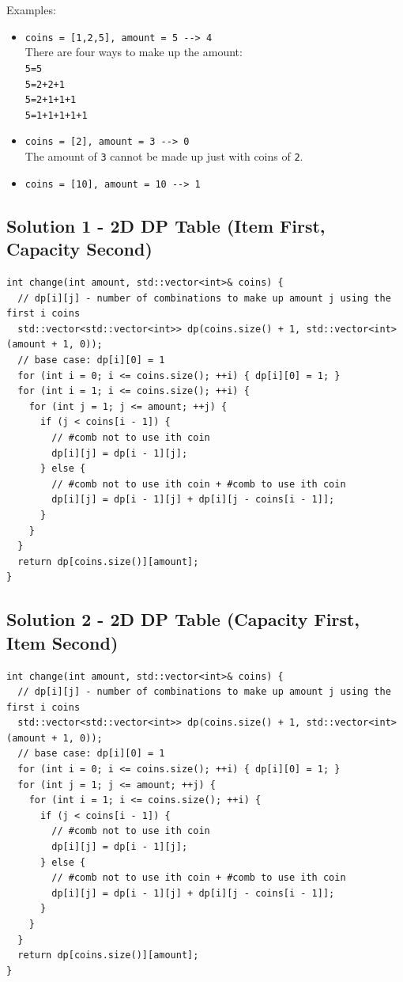 Examples:
\begin{itemize}
\item {\colorbox{CodeBackground}{\lstinline|coins = [1,2,5], amount = 5 --> 4|}}\\
There are four ways to make up the amount:\\
{\colorbox{CodeBackground}{\lstinline|5=5|}} \\
{\colorbox{CodeBackground}{\lstinline|5=2+2+1|}} \\
{\colorbox{CodeBackground}{\lstinline|5=2+1+1+1|}} \\
{\colorbox{CodeBackground}{\lstinline|5=1+1+1+1+1|}}
\item {\colorbox{CodeBackground}{\lstinline|coins = [2], amount = 3 --> 0|}}\\
The amount of {\colorbox{CodeBackground}{\lstinline|3|}} cannot be made up just with coins of {\colorbox{CodeBackground}{\lstinline|2|}}.
\item {\colorbox{CodeBackground}{\lstinline|coins = [10], amount = 10 --> 1|}}
\end{itemize}

\subsection*{Solution 1 - 2D DP Table (Item First, Capacity Second)}
\begin{lstlisting}
int change(int amount, std::vector<int>& coins) {
  // dp[i][j] - number of combinations to make up amount j using the first i coins
  std::vector<std::vector<int>> dp(coins.size() + 1, std::vector<int>(amount + 1, 0));
  // base case: dp[i][0] = 1
  for (int i = 0; i <= coins.size(); ++i) { dp[i][0] = 1; }
  for (int i = 1; i <= coins.size(); ++i) {
    for (int j = 1; j <= amount; ++j) {
      if (j < coins[i - 1]) {
        // #comb not to use ith coin
        dp[i][j] = dp[i - 1][j];
      } else {
        // #comb not to use ith coin + #comb to use ith coin
        dp[i][j] = dp[i - 1][j] + dp[i][j - coins[i - 1]];
      }
    }
  }
  return dp[coins.size()][amount];
}
\end{lstlisting}

\subsection*{Solution 2 - 2D DP Table (Capacity First, Item Second)}
\begin{lstlisting}
int change(int amount, std::vector<int>& coins) {
  // dp[i][j] - number of combinations to make up amount j using the first i coins
  std::vector<std::vector<int>> dp(coins.size() + 1, std::vector<int>(amount + 1, 0));
  // base case: dp[i][0] = 1
  for (int i = 0; i <= coins.size(); ++i) { dp[i][0] = 1; }
  for (int j = 1; j <= amount; ++j) {
    for (int i = 1; i <= coins.size(); ++i) {
      if (j < coins[i - 1]) {
        // #comb not to use ith coin
        dp[i][j] = dp[i - 1][j];
      } else {
        // #comb not to use ith coin + #comb to use ith coin
        dp[i][j] = dp[i - 1][j] + dp[i][j - coins[i - 1]];
      }
    }
  }
  return dp[coins.size()][amount];
}
\end{lstlisting}

